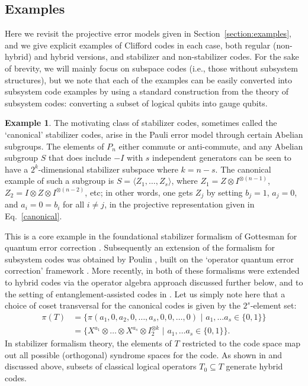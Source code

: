 \documentclass[11pt]{article}
\theoremstyle{definition}
\newtheorem{example}{Example}
\begin{document}
\subsection{Examples}

Here we revisit the projective error models given in Section~\ref{section:examples}, and we give explicit examples of Clifford codes in each case, both regular (non-hybrid) and hybrid versions, and stabilizer and non-stabilizer codes. 
For the sake of brevity, we will mainly focus on subspace codes (i.e., those without subsystem structures), but we note that each of the examples can be easily converted into subsystem code examples by using a standard construction from the theory of subsystem codes: converting a subset of logical qubits into gauge qubits. 

\begin{example}
    The motivating class of stabilizer codes, sometimes called the `canonical' stabilizer codes, arise in the Pauli error model through certain Abelian subgroups. The elements of $P_n$ either commute or anti-commute, and any Abelian subgroup $S$ that does include $-I$ with $s$ independent generators can be seen to have a $2^{k}$-dimensional stabilizer subspace where $k=n-s$. The canonical example of such a subgroup is $S = \langle Z_1, \ldots , Z_{s} \rangle$, where $Z_1 = Z \otimes I^{\otimes (n-1)}$, $Z_2 = I \otimes Z \otimes I^{\otimes (n-2)}$, etc; in other words, one gets $Z_j$ by setting $b_j = 1$, $a_j = 0$, and $a_i = 0 = b_i$ for all $i \neq j$, in the projective representation given in Eq.~\eqref{canonical}.

    This is a core example in the foundational stabilizer formalism of Gottesman for quantum error correction \cite{gottesman1996class,gottesman1997stabilizer}. Subsequently an extension of the formalism for subsystem codes was obtained by Poulin \cite{Poulin2005Stabilizer}, built on the `operator quantum error correction' framework \cite{Kribs2005Unified,Kribs2006oqec}. More recently, in \cite{DauphinaiKribsVasmer2024} both of these formalisms were extended to hybrid codes via the operator algebra approach discussed further below, and to the setting of entanglement-assisted codes in \cite{NadkarniAdonsouDauphinaisKribsVasmer2024}. Let us simply note here that a choice of coset transversal for the canonical codes is given by the $2^s$-element set: 
    \begin{align*} 
        \pi(T)
        & = \big\{ \pi ( a_1, 0, a_2, 0, \ldots , a_s, 0, 0, \ldots , 0) \,\, | \,\, a_1 , \ldots a_s \in \{ 0,1 \}   \big\} \\ 
        & = \big\{ X^{a_1} \otimes \ldots \otimes X^{a_s}\otimes I_2^{\otimes k} \,\, | \,\, a_1 , \ldots a_s \in \{ 0,1 \}   \big\}.
    \end{align*} 
    In stabilizer formalism theory, the elements of $T$ restricted to the code space map out all possible (orthogonal) syndrome spaces for the code. As shown in \cite{DauphinaiKribsVasmer2024,NadkarniAdonsouDauphinaisKribsVasmer2024} and discussed above, subsets of classical logical operators $T_0 \subseteq T$ generate hybrid codes. 
\end{example}
\end{document}
